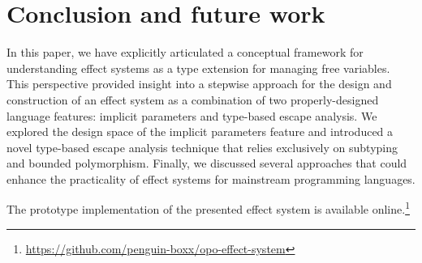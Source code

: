 \documentclass[acmsmall,review,screen]{acmart}
\begin{document}
\section{Conclusion and future work} \label{sec:conclusion}

In this paper, we have explicitly articulated a conceptual framework for understanding effect systems as a type extension for managing free variables.
This perspective provided insight into a stepwise approach for the design and construction of an effect system as a combination of two properly-designed language features: implicit parameters and type-based escape analysis.
We explored the design space of the implicit parameters feature and introduced a novel type-based escape analysis technique that relies exclusively on subtyping and bounded polymorphism.
Finally, we discussed several approaches that could enhance the practicality of effect systems for mainstream programming languages.

The prototype implementation of the presented effect system is available online.\footnote{\url{https://github.com/penguin-boxx/opo-effect-system}}






\end{document}
